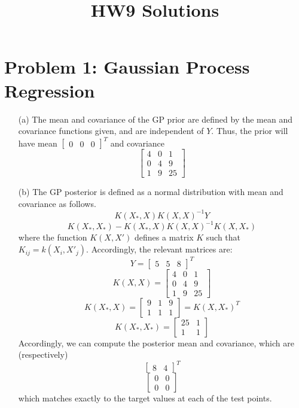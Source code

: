 \documentclass{article}
\title{HW9 Solutions}
\author{}
\date{}
\begin{document}
\maketitle

\section*{Problem 1: Gaussian Process Regression}
\begin{enumerate}
    \item[(a)] The mean and covariance of the GP prior are defined by the mean and covariance functions given, and are independent of $Y$. Thus, the prior will have mean $\begin{bmatrix} 0 & 0 & 0 \end{bmatrix}^T$ and covariance
    $$\begin{bmatrix} 4 & 0 & 1 \\ 0 & 4 & 9 \\ 1 & 9 & 25\end{bmatrix}$$
    \item[(b)] The GP posterior is defined as a normal distribution with mean and covariance as follows.
    $$K(X_*, X)K(X, X)^{-1}Y$$
    $$K(X_*, X_*) - K(X_*,X)K(X, X)^{-1}K(X, X_*)$$
    where the function $K(X, X')$ defines a matrix $K$ such that $K_{ij} = k(X_i, X'_j)$. Accordingly, the relevant matrices are:
    $$Y = \begin{bmatrix} 5 & 5 & 8 \end{bmatrix}^T$$
    $$K(X, X) = \begin{bmatrix} 4 & 0 & 1 \\ 0 & 4 & 9 \\ 1 & 9 & 25\end{bmatrix}$$
    $$K(X_*, X) = \begin{bmatrix} 9 & 1 & 9 \\ 1 & 1 & 1 \end{bmatrix} = K(X, X_*)^T$$
    $$K(X_*, X_*) = \begin{bmatrix} 25 & 1 \\ 1 & 1 \end{bmatrix}$$
    Accordingly, we can compute the posterior mean and covariance, which are (respectively)
    $$\begin{bmatrix} 8 & 4 \end{bmatrix}^T$$
    $$\begin{bmatrix} 0 & 0 \\ 0 & 0 \end{bmatrix}$$
    which matches exactly to the target values at each of the test points.
\end{enumerate}
\end{document}
